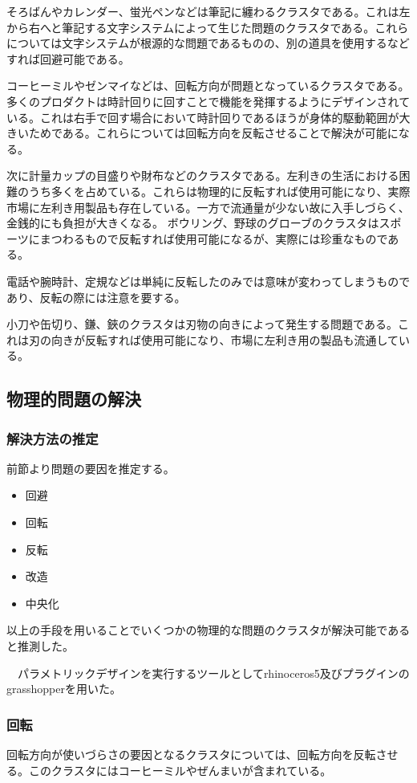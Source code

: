 \documentclass{jsarticle}
\begin{document}
そろばんやカレンダー、蛍光ペンなどは筆記に纏わるクラスタである。これは左から右へと筆記する文字システムによって生じた問題のクラスタである。これらについては文字システムが根源的な問題であるものの、別の道具を使用するなどすれば回避可能である。

コーヒーミルやゼンマイなどは、回転方向が問題となっているクラスタである。多くのプロダクトは時計回りに回すことで機能を発揮するようにデザインされている。これは右手で回す場合において時計回りであるほうが身体的駆動範囲が大きいためである。これらについては回転方向を反転させることで解決が可能になる。

次に計量カップの目盛りや財布などのクラスタである。左利きの生活における困難のうち多くを占めている。これらは物理的に反転すれば使用可能になり、実際市場に左利き用製品も存在している。一方で流通量が少ない故に入手しづらく、金銭的にも負担が大きくなる。
ボウリング、野球のグローブのクラスタはスポーツにまつわるもので反転すれば使用可能になるが、実際には珍重なものである。

電話や腕時計、定規などは単純に反転したのみでは意味が変わってしまうものであり、反転の際には注意を要する。

小刀や缶切り、鎌、鋏のクラスタは刃物の向きによって発生する問題である。これは刃の向きが反転すれば使用可能になり、市場に左利き用の製品も流通している。
\newpage
\subsection{物理的問題の解決}

\subsubsection{解決方法の推定}
前節より問題の要因を推定する。

\begin{itemize}
  \item{回避}
  \item{回転}
  \item{反転}
  \item{改造}
  \item{中央化}
\end{itemize}

以上の手段を用いることでいくつかの物理的な問題のクラスタが解決可能であると推測した。

　パラメトリックデザインを実行するツールとしてrhinoceros5及びプラグインのgrasshopperを用いた。

\subsubsection{回転}
回転方向が使いづらさの要因となるクラスタについては、回転方向を反転させる。このクラスタにはコーヒーミルやぜんまいが含まれている。
\end{document}
